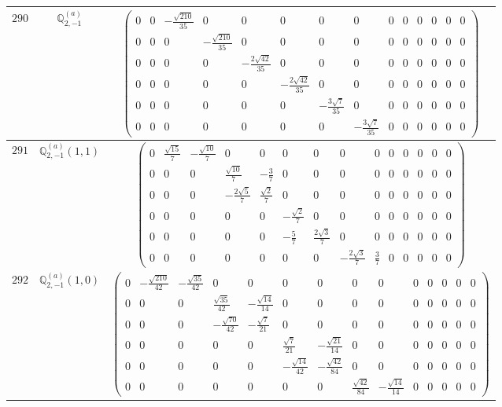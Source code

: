 \documentclass[fleqn,8pt,landscape]{jsarticle}
\begin{document}
\begin{center}
\begin{longtable}{ccc}
$ 290 $ & $ \mathbb{Q}_{2,-1}^{(a)} $ & $ \begin{pmatrix} 0 & 0 & - \frac{\sqrt{210}}{35} & 0 & 0 & 0 & 0 & 0 & 0 & 0 & 0 & 0 & 0 & 0 \\ 0 & 0 & 0 & - \frac{\sqrt{210}}{35} & 0 & 0 & 0 & 0 & 0 & 0 & 0 & 0 & 0 & 0 \\ 0 & 0 & 0 & 0 & - \frac{2 \sqrt{42}}{35} & 0 & 0 & 0 & 0 & 0 & 0 & 0 & 0 & 0 \\ 0 & 0 & 0 & 0 & 0 & - \frac{2 \sqrt{42}}{35} & 0 & 0 & 0 & 0 & 0 & 0 & 0 & 0 \\ 0 & 0 & 0 & 0 & 0 & 0 & - \frac{3 \sqrt{7}}{35} & 0 & 0 & 0 & 0 & 0 & 0 & 0 \\ 0 & 0 & 0 & 0 & 0 & 0 & 0 & - \frac{3 \sqrt{7}}{35} & 0 & 0 & 0 & 0 & 0 & 0 \end{pmatrix} $ \\ \hline
$ 291 $ & $ \mathbb{Q}_{2,-1}^{(a)}(1,1) $ & $ \begin{pmatrix} 0 & \frac{\sqrt{15}}{7} & - \frac{\sqrt{10}}{7} & 0 & 0 & 0 & 0 & 0 & 0 & 0 & 0 & 0 & 0 & 0 \\ 0 & 0 & 0 & \frac{\sqrt{10}}{7} & - \frac{3}{7} & 0 & 0 & 0 & 0 & 0 & 0 & 0 & 0 & 0 \\ 0 & 0 & 0 & - \frac{2 \sqrt{5}}{7} & \frac{\sqrt{2}}{7} & 0 & 0 & 0 & 0 & 0 & 0 & 0 & 0 & 0 \\ 0 & 0 & 0 & 0 & 0 & - \frac{\sqrt{2}}{7} & 0 & 0 & 0 & 0 & 0 & 0 & 0 & 0 \\ 0 & 0 & 0 & 0 & 0 & - \frac{5}{7} & \frac{2 \sqrt{3}}{7} & 0 & 0 & 0 & 0 & 0 & 0 & 0 \\ 0 & 0 & 0 & 0 & 0 & 0 & 0 & - \frac{2 \sqrt{3}}{7} & \frac{3}{7} & 0 & 0 & 0 & 0 & 0 \end{pmatrix} $ \\ \hline
$ 292 $ & $ \mathbb{Q}_{2,-1}^{(a)}(1,0) $ & $ \begin{pmatrix} 0 & - \frac{\sqrt{210}}{42} & - \frac{\sqrt{35}}{42} & 0 & 0 & 0 & 0 & 0 & 0 & 0 & 0 & 0 & 0 & 0 \\ 0 & 0 & 0 & \frac{\sqrt{35}}{42} & - \frac{\sqrt{14}}{14} & 0 & 0 & 0 & 0 & 0 & 0 & 0 & 0 & 0 \\ 0 & 0 & 0 & - \frac{\sqrt{70}}{42} & - \frac{\sqrt{7}}{21} & 0 & 0 & 0 & 0 & 0 & 0 & 0 & 0 & 0 \\ 0 & 0 & 0 & 0 & 0 & \frac{\sqrt{7}}{21} & - \frac{\sqrt{21}}{14} & 0 & 0 & 0 & 0 & 0 & 0 & 0 \\ 0 & 0 & 0 & 0 & 0 & - \frac{\sqrt{14}}{42} & - \frac{\sqrt{42}}{84} & 0 & 0 & 0 & 0 & 0 & 0 & 0 \\ 0 & 0 & 0 & 0 & 0 & 0 & 0 & \frac{\sqrt{42}}{84} & - \frac{\sqrt{14}}{14} & 0 & 0 & 0 & 0 & 0 \end{pmatrix} $ \\ \hline

\end{longtable}
\end{center}
\end{document}

